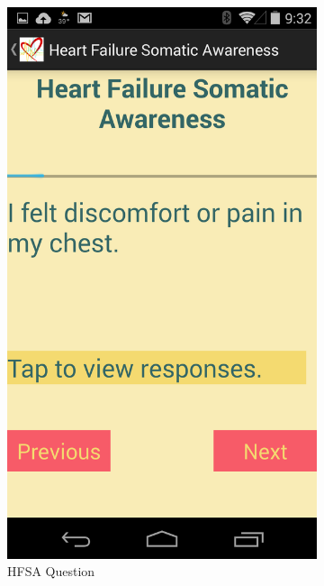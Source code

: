 \begin{figure}[ht]
\begin{subfigure}[b]{0.3\textwidth}
    \includegraphics[scale=1,width=\textwidth]{Images/HFSA_question.png}
	\caption{HFSA Question}
  	\label{fig:HFSA_Q}
  \end{subfigure}
  ~
  \begin{subfigure}[b]{0.3\textwidth}

\end{subfigure}
\end{figure}
